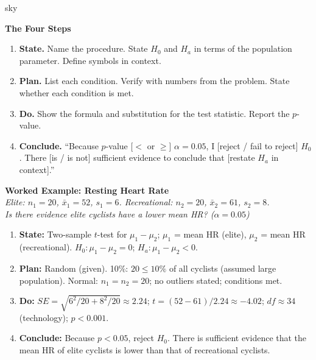 \documentclass[10pt]{article}
\begin{document}
\begin{skillbox}{sky}
\begin{minipage}[t]{0.46\linewidth}
    \textbf{The Four Steps}
    \begin{enumerate}
        \item \textbf{State.} Name the procedure. State $H_0$ and $H_a$ in terms of the
              population parameter. Define symbols in context.
        \item \textbf{Plan.} List each condition. Verify with numbers from the problem.
              State whether each condition is met.
        \item \textbf{Do.} Show the formula and substitution for the test statistic.
              Report the $p$-value.
        \item \textbf{Conclude.} ``Because $p$-value [$ < $ or $ \ge $] $\alpha = 0.05$,
              I [reject / fail to reject] $H_0$. There [is / is not] sufficient evidence
              to conclude that [restate $H_a$ in context].''
    \end{enumerate}
\end{minipage}
\hfill
\begin{minipage}[t]{0.50\linewidth}
    \textbf{Worked Example: Resting Heart Rate}\\
    \textit{Elite: $n_1=20$, $\bar x_1=52$, $s_1=6$. \;
    Recreational: $n_2=20$, $\bar x_2=61$, $s_2=8$. \\
    Is there evidence elite cyclists have a lower mean HR? ($\alpha=0.05$)}
    \begin{enumerate}
        \item \textbf{State:} Two-sample $t$-test for $\mu_1-\mu_2$; $\mu_1$ = mean HR (elite),
              $\mu_2$ = mean HR (recreational). $H_0: \mu_1-\mu_2=0$; $H_a: \mu_1-\mu_2<0$.
        \item \textbf{Plan:} Random (given). 10\%: $20 \le 10\%$ of all cyclists (assumed large
              population). Normal: $n_1=n_2=20$; no outliers stated; conditions met.
        \item \textbf{Do:} $SE = \sqrt{6^2/20 + 8^2/20} \approx 2.24$;
              $t = (52-61)/2.24 \approx -4.02$; $df \approx 34$ (technology); $p < 0.001$.
        \item \textbf{Conclude:} Because $p < 0.05$, reject $H_0$. There is sufficient evidence
              that the mean HR of elite cyclists is lower than that of recreational cyclists.
    \end{enumerate}
\end{minipage}
\end{skillbox}
\end{document}
